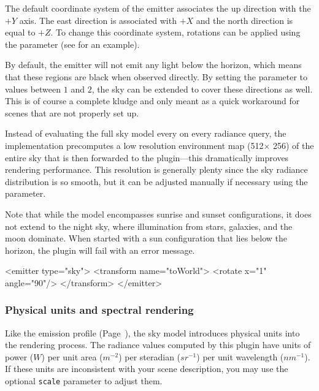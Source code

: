 The default coordinate system of the emitter associates the up
direction with the $+Y$ axis. The east direction is associated with $+X$
and the north direction is equal to $+Z$. To change this coordinate
system, rotations can be applied using the  parameter
(see  for an example).

By default, the emitter will not emit any light below the
horizon, which means that these regions are black when
observed directly. By setting the  parameter to values
between $1$ and $2$, the sky can be extended to cover these directions
as well. This is of course a complete kludge and only meant as a quick
workaround for scenes that are not properly set up.

Instead of evaluating the full sky model every on every radiance query,
the implementation precomputes a low resolution environment map
(512$\times$ 256) of the entire sky that is then forwarded to the
 plugin---this dramatically improves rendering
performance. This resolution is generally plenty since the sky radiance
distribution is so smooth, but it can be adjusted manually if
necessary using the  parameter.

Note that while the model encompasses sunrise and sunset configurations,
it does not extend to the night sky, where illumination from stars, galaxies,
and the moon dominate. When started with a sun configuration that lies
below the horizon, the plugin will fail with an error message.

\vspace{5mm}
\begin{xml}[caption={Rotating the sky emitter for scenes that use $Z$ as
the ``up'' direction}, label=lst:sky-up]
<emitter type="sky">
    <transform name="toWorld">
        <rotate x="1" angle="90"/>
    </transform>
</emitter>
\end{xml}

\subsubsection*{Physical units and spectral rendering}
Like the  emission profile (Page~\pageref{sec:blackbody}),
the sky model introduces physical units into the rendering process.
The radiance values computed by this plugin have units of power ($W$) per
unit area ($m^{-2}$) per steradian ($sr^{-1}$) per unit wavelength ($nm^{-1}$).
If these units are inconsistent with your scene description, you may use the
optional \texttt{scale} parameter to adjust them.

